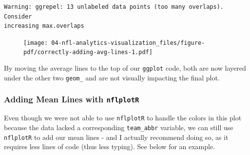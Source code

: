\documentclass[
  letterpaper,
]{krantz}
\begin{document}
\begin{verbatim}
Warning: ggrepel: 13 unlabeled data points (too many overlaps). Consider
increasing max.overlaps
\end{verbatim}

\begin{figure}[H]

{\centering \texttt{[image: 04-nfl-analytics-visualization\_files/figure-pdf/correctly-adding-avg-lines-1.pdf]}

}

\end{figure}

By moving the average lines to the top of our \texttt{ggplot} code, both
are now layered under the other two \texttt{geom\_} and are not visually
impacting the final plot.

\hypertarget{adding-mean-lines-with-nflplotr}{%
\subsubsection{\texorpdfstring{Adding Mean Lines with
\texttt{nflplotR}}{Adding Mean Lines with nflplotR}}\label{adding-mean-lines-with-nflplotr}}

\begin{tcolorbox}[enhanced jigsaw, colback=white, leftrule=.75mm, breakable, colframe=quarto-callout-tip-color-frame, bottomtitle=1mm, rightrule=.15mm, left=2mm, opacityback=0, bottomrule=.15mm, arc=.35mm, coltitle=black, colbacktitle=quarto-callout-tip-color!10!white, toptitle=1mm, titlerule=0mm, title=\textcolor{quarto-callout-tip-color}{\faLightbulb}\hspace{0.5em}{Tip}, toprule=.15mm, opacitybacktitle=0.6]

Even though we were not able to use \texttt{nflplotR} to handle the
colors in this plot because the data lacked a corresponding
\texttt{team\_abbr} variable, we can still use \texttt{nflplotR} to add
our mean lines - and I actually recommend doing so, as it requires less
lines of code (thus less typing). See below for an example.

\end{tcolorbox}
\end{document}
